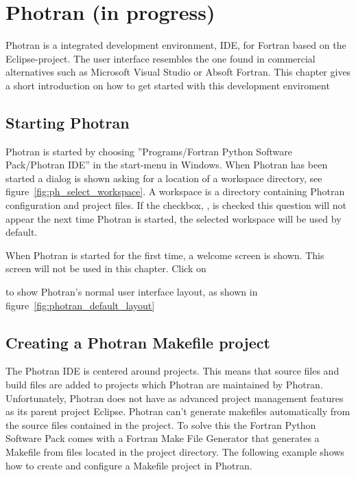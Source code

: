 \chapter{Photran (in progress)}

Photran is a integrated development environment, IDE, for
Fortran based on the Eclipse-project. The user interface
resembles the one found in commercial alternatives such as
Microsoft Visual Studio or Absoft Fortran. This chapter gives a
short introduction on how to get started with this development
enviroment

\section{Starting Photran}

Photran is started by choosing ''Programs/Fortran Python
Software Pack/Photran IDE'' in the start-menu in Windows. When
Photran has been started a dialog is shown asking for a location of a workspace directory, see
figure~\ref{fig:ph_select_workspace}. A workspace is a
directory containing Photran configuration and project files.
If the checkbox, , is
checked this question will not appear the next time Photran is
started, the selected workspace will be used by default.


When Photran is started for the first time, a welcome screen is shown. This screen will not be used in this chapter. Click on


\noindent to show Photran's normal user interface layout, as
shown in figure~\ref{fig:photran_default_layout}


\section{Creating a Photran Makefile project}

The Photran IDE is centered around projects. This means that
source files and build files are added to projects which
Photran are maintained by Photran. Unfortunately, Photran does
not have as advanced project management features as its parent
project Eclipse. Photran can't generate makefiles automatically from the source files contained in the project. To solve this
the Fortran Python Software Pack comes with a Fortran Make File Generator that generates a Makefile from files located in the
project directory. The following example shows how to create
and configure a Makefile project in Photran.

